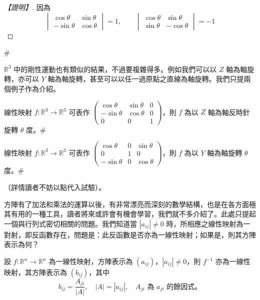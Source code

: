 \begin{proof}[【證明】]
因為
\[ \begin{vmatrix} \cos\theta & \sin\theta \\ -\sin\theta & \cos\theta \end{vmatrix} = 1, \qquad \begin{vmatrix} \cos\theta & \sin\theta \\ \sin\theta & -\cos\theta \end{vmatrix} = -1 \]
\end{proof}\hfill$\#$

$\mathbb{R}^3$ 中的剛性運動也有類似的結果，不過要複雜得多。例如我們可以以 $Z$ 軸為軸旋轉，亦可以 $Y$ 軸為軸旋轉，甚至可以以任一過原點之直線為軸旋轉。我們只提兩個例子作為介紹。

\begin{example}[*]\label{ex:b6-1-38}
線性映射 $f: \mathbb{R}^3 \longrightarrow \mathbb{R}^3$ 可表作 $\begin{pmatrix} \cos\theta & \sin\theta & 0 \\ -\sin\theta & \cos\theta & 0 \\ 0 & 0 & 1 \end{pmatrix}$，則 $f$ 為以 $Z$ 軸為軸反時針旋轉 $\theta$ 度。\hfill$\#$
\end{example}

\begin{example}[*]\label{ex:b6-1-39}
線性映射 $f: \mathbb{R}^3 \longrightarrow \mathbb{R}^3$ 可表作 $\begin{pmatrix} \cos\theta & 0 & \sin\theta \\ 0 & 1 & 0 \\ -\sin\theta & 0 & \cos\theta \end{pmatrix}$，則 $f$ 為以 $Y$ 軸為軸旋轉 $\theta$ 度。\hfill$\#$
\end{example}
（詳情讀者不妨以點代入試驗）。

方陣有了加法和乘法的運算以後，有非常漂亮而深刻的數學結構，也是在各方面極其有用的一種工具，讀者將來或許會有機會學習，我們就不多介紹了。此處只提起一個與行列式密切相關的問題。我們知道當 $|a_{ij}| \ne 0$ 時，所相應之線性映射為一對射，即反函數存在，問題是：此反函數是否亦為一線性映射；如果是，則其方陣表示為何？

\begin{theorem}\label{thm:b6-1-21}
設 $f: \mathbb{R}^n \longrightarrow \mathbb{R}^n$ 為一線性映射，方陣表示為 $(a_{ij})$，$|a_{ij}| \ne 0$，則 $f^{-1}$ 亦為一線性映射，其方陣表示為 $(b_{ij})$，其中
\[ b_{ij} = \dfrac{A_{ji}}{|A|}, \quad |A| = |a_{ij}|, \quad A_{ji} \text{ 為 } a_{ji} \text{ 的餘因式。} \]
\end{theorem}

